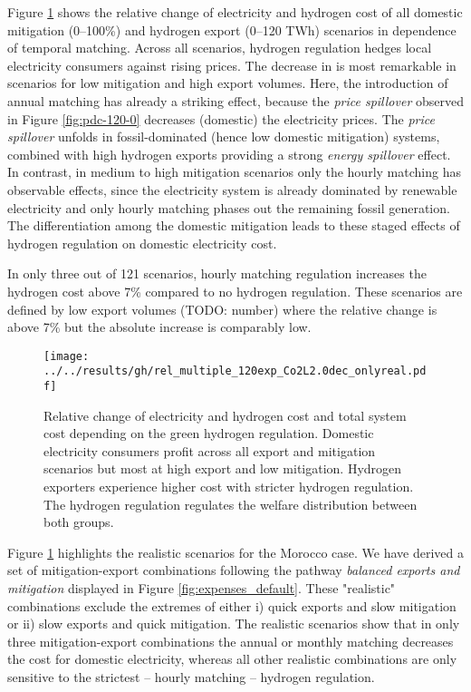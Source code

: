 Figure \ref{fig:expenses_real_120} shows the relative change of electricity and hydrogen cost of all domestic mitigation (0--100\%) and hydrogen export (0--120 TWh) scenarios in dependence of temporal matching. 
Across all scenarios, hydrogen regulation hedges local electricity consumers against rising prices. The decrease in is most remarkable in scenarios for low mitigation and high export volumes. Here, the introduction of annual matching has already a striking effect, because the \textit{price spillover} observed in Figure \ref{fig:pdc-120-0} decreases (domestic) the electricity prices. The \textit{price spillover} unfolds in fossil-dominated (hence low domestic mitigation) systems, combined with high hydrogen exports providing a strong \textit{energy spillover} effect.
In contrast, in medium to high mitigation scenarios only the hourly matching has observable effects, since the electricity system is already  dominated by renewable electricity and only hourly matching phases out the remaining fossil generation. The differentiation among the domestic mitigation leads to these staged effects of hydrogen regulation on domestic electricity cost.

In only three out of 121 scenarios, hourly matching regulation increases the hydrogen cost above 7\% compared to no hydrogen regulation. These scenarios are defined by low export volumes (TODO: number) where the relative change is above 7\% but the absolute increase is comparably low.


\begin{figure}[h!]
    \centering
    \texttt{[image: ../../results/gh/rel\_multiple\_120exp\_Co2L2.0dec\_onlyreal.pdf]}
    \caption{Relative change of electricity and hydrogen cost and total system cost depending on the green hydrogen regulation. Domestic electricity consumers profit across all export and mitigation scenarios but most at high export and low mitigation. Hydrogen exporters experience higher cost with stricter hydrogen regulation. The hydrogen regulation regulates the welfare distribution between both groups.}
    \label{fig:expenses_real_120}
\end{figure}


Figure \ref{fig:expenses_real_120} highlights the realistic scenarios for the Morocco case. We have derived a set of mitigation-export combinations following the pathway \textit{balanced exports and mitigation} displayed in Figure \ref{fig:expenses_default}. These "realistic" combinations exclude the extremes of either i) quick exports and slow mitigation or ii)
slow exports and quick mitigation. The realistic scenarios show that in only three mitigation-export combinations the annual or monthly matching decreases the cost for domestic electricity, whereas all other realistic combinations are only sensitive to the strictest -- hourly matching -- hydrogen regulation. 


